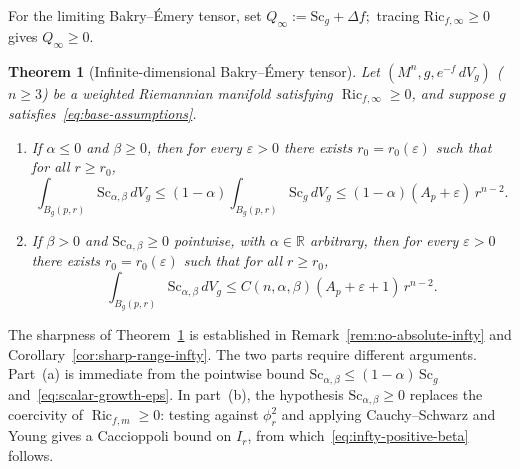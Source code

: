 \documentclass[12pt,oneside,a4paper]{article}
\theoremstyle{mytheorem}
\newtheorem{theorem}[definition]{Theorem}
\theoremstyle{remark}
\begin{document}
For the limiting Bakry--\'Emery tensor, set
$Q_\infty:=\mathrm{Sc}_g+\Delta f;$ tracing $\mathrm{Ric}_{f,\infty}\ge 0$ gives $Q_\infty\ge 0$.

\begin{theorem}[Infinite-dimensional Bakry--\'Emery tensor]
\label{thm:infinite-N}
Let $(M^n,g,e^{-f}\,dV_g)$ ($n\geq 3$)  be a weighted Riemannian manifold
satisfying $\operatorname{Ric}_{f,\infty}\ge 0$, and suppose $g$
satisfies~\eqref{eq:base-assumptions}.
\begin{enumerate}
\item[\textup{(a)}] If $\alpha\le 0$ and $\beta\ge 0$, then for every
$\varepsilon>0$ there exists $r_0=r_0(\varepsilon)$ such that for all
$r\ge r_0$,
\begin{equation}\label{eq:infty-signed-upper}
  \int_{B_g(p,r)}\mathrm{Sc}_{\alpha,\beta}\,dV_g
  \le(1-\alpha)\int_{B_g(p,r)}\mathrm{Sc}_g\,dV_g
  \le(1-\alpha)(A_p+\varepsilon)\,r^{n-2}.
\end{equation}

\item[\textup{(b)}] If $\beta>0$ and $\mathrm{Sc}_{\alpha,\beta}\ge 0$
pointwise, with $\alpha\in\mathbb{R}$ arbitrary, then for every $\varepsilon>0$
there exists $r_0=r_0(\varepsilon)$ such that for all $r\ge r_0$,
\begin{equation}\label{eq:infty-positive-beta}
  \int_{B_g(p,r)}\mathrm{Sc}_{\alpha,\beta}\,dV_g
  \le C(n,\alpha,\beta)(A_p+\varepsilon+1)\,r^{n-2}.
\end{equation}
\end{enumerate}
\end{theorem}

The sharpness of Theorem~\ref{thm:infinite-N} is established in
Remark~\ref{rem:no-absolute-infty} and Corollary~\ref{cor:sharp-range-infty}.
The two parts require different arguments. Part~\textup{(a)} is immediate
from the pointwise bound $\mathrm{Sc}_{\alpha,\beta}\le(1-\alpha)\,\mathrm{Sc}_g$
and~\eqref{eq:scalar-growth-eps}. In part~\textup{(b)}, the hypothesis
$\mathrm{Sc}_{\alpha,\beta}\ge 0$ replaces the coercivity of
$\operatorname{Ric}_{f,m}\ge 0$: testing against $\phi_r^2$ and applying
Cauchy--Schwarz and Young gives a Caccioppoli bound on $I_r$, from
which~\eqref{eq:infty-positive-beta} follows.
\end{document}
